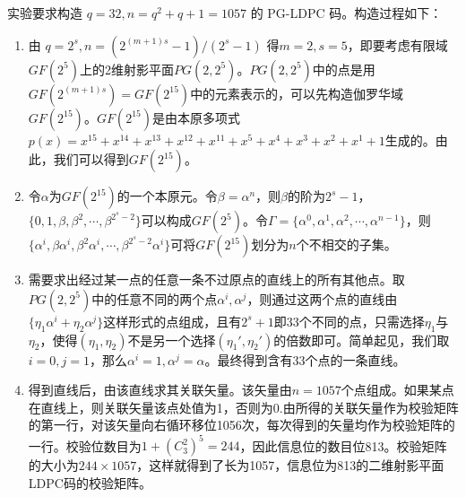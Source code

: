 \documentclass[lang=cn,11pt,a4paper,numbers]{elegantpaper}
\begin{document}
实验要求构造 $q=32, n=q^2+q+1=1057$ 的 PG-LDPC 码。构造过程如下：
\begin{enumerate}[1)]
    \item 由 $\displaystyle{q=2^s, n=(2^{(m+1)s}-1)/(2^s-1)}$ 得$m=2,s=5$，即要考虑有限域$GF(2^5)$上的2维射影平面$PG(2,2^5)$。$PG(2,2^5)$中的点是用$GF(2^{(m+1)s})=GF(2^{15})$中的元素表示的，可以先构造伽罗华域$GF(2^{15})$。$GF(2^{15})$是由本原多项式$p(x)=x^{15}+x^{14}+x^{13}+x^{12}+x^{11}+x^5+x^4+x^3+x^2+x^1+1$生成的。由此，我们可以得到$GF(2^{15})$。
    \item 令$\alpha$为$GF(2^{15})$的一个本原元。令$\beta=\alpha^n$，则$\beta$的阶为$2^s-1$，$\{0,1,\beta,\beta^2,\cdots,\beta^{2^s-2}\}$可以构成$GF(2^5)$。令$\Gamma = \{\alpha^0,\alpha^1,\alpha^2,\cdots,\alpha^{n-1}\}$，则$\{\alpha^i,\beta\alpha^i,\beta^2\alpha^i,\cdots,\beta^{2^s-2}\alpha^i\}$可将$GF(2^{15})$划分为$n$个不相交的子集。
    \item 需要求出经过某一点的任意一条不过原点的直线上的所有其他点。取$PG(2,2^5)$中的任意不同的两个点$\alpha^i,\alpha^j$，则通过这两个点的直线由$\{\eta_1\alpha^i+\eta_2\alpha^j\}$这样形式的点组成，且有$2^s+1$即33个不同的点，只需选择$\eta_1$与$\eta_2$，使得$(\eta_1,\eta_2)$不是另一个选择$(\eta_1',\eta_2')$的倍数即可。简单起见，我们取$i=0,j=1$，那么$\alpha^i=1,\alpha^j=\alpha$。最终得到含有33个点的一条直线。
    \item 得到直线后，由该直线求其关联矢量。该矢量由$n=1057$个点组成。如果某点在直线上，则关联矢量该点处值为1，否则为0.由所得的关联矢量作为校验矩阵的第一行，对该矢量向右循环移位1056次，每次得到的矢量均作为校验矩阵的一行。校验位数目为$1+(C_3^2)^5=244$，因此信息位的数目位813。校验矩阵的大小为$244\times 1057$，这样就得到了长为1057，信息位为813的二维射影平面LDPC码的校验矩阵。
\end{enumerate}
\end{document}
